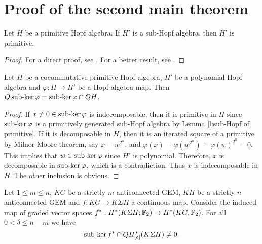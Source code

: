 \section{Proof of the second main theorem}\label{s:proof of thm on 2-stage Postnikov systems}

\begin{lem}\label{l:sub-Hopf of primitive}
Let $H$ be a primitive Hopf algebra. If $H'$ is a sub-Hopf algebra, then $H'$ is primitive.
\end{lem}

\begin{proof}
For a direct proof, see \cite[Proposition 2.6, p. 69]{Sm70}. For a better result, see \cite[Proposition 6.3, p. 247]{MM65}.
\end{proof}

\begin{lem}\label{l:indecomposables}
Let $H$ be a cocommutative primitive Hopf algebra, $H'$ be a polynomial Hopf algebra and $\varphi:H\to H'$ be a Hopf algebra map. Then $Q\operatorname{sub-ker} \varphi=\operatorname{sub-ker}\varphi\cap QH$.
\end{lem}

\begin{proof}
If $x\not=0\in\operatorname{sub-ker}\varphi$ is indecomposable, then it is primitive in $H$ since $\operatorname{sub-ker}\varphi$ is a primitively generated sub-Hopf algebra by Lemma \ref{l:sub-Hopf of primitive}. If it is decomposable in $H$, then it is an iterated square of a primitive by Milnor-Moore theorem, say $x=w^{2^n}$, and $\varphi(x)=\varphi(w^{2^n})=\varphi(w)^{2^n}=0$. This implies that $w\in\operatorname{sub-ker}\varphi$ since $H'$ is polynomial. Therefore, $x$ is decomposable in $\operatorname{sub-ker}\varphi$, which is a contradiction. Thus $x$ is indecomposable in $H$. The other inclusion is obvious.
\end{proof}

\begin{lem}\label{l:kernel}
Let $1\leq m\leq n$, $KG$ be a strictly $m$-anticonnected GEM, $KH$ be a strictly $n$-anticonnected GEM and $f:KG\to K\Sigma H$ a continuous map. Consider the induced map of graded vector spaces $f^*:H^*(K\Sigma H;\mathbb{F}_2)\to H^*(KG;\mathbb{F}_2)$. For all $0<\delta\leq n-m$ we have
$$
\operatorname{sub-ker} f^*\cap QH^*_{[\delta]}(K\Sigma H)\not=0.
$$
\end{lem}

